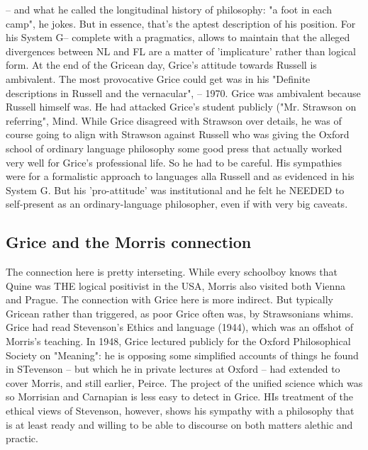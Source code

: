 \documentclass[10pt,titlepage]{book}
\begin{document}
{-- and  what he called the longitudinal history of philosophy: "a foot in 
each camp", he  jokes. But in essence, that's the aptest description of his 
position. For his  System G-- complete with a pragmatics, allows to maintain 
that the alleged  divergences between NL and FL are a matter of 
'implicature' rather than logical  form.  At the end of the Gricean  day, Grice's  
attitude towards Russell is ambivalent. The most  provocative Grice could  get 
was in his "Definite descriptions in Russell and the  
vernacular",  -- 1970. Grice was ambivalent because Russell himself was. He 
had attacked  Grice's student publicly ("Mr. Strawson on referring", Mind.  
While Grice  disagreed with Strawson over details, he was of course going 
to  align with  Strawson against Russell who was giving the Oxford school of 
ordinary   language philosophy some good press that actually worked very 
well for  Grice's  professional life. So he had to be careful. His sympathies 
were  for a  formalistic approach to languages alla Russell and as evidenced 
in  his System  G. But his 'pro-attitude' was institutional and he felt he  
NEEDED to  self-present as an ordinary-language philosopher, even if with  
very big  caveats. 

\subsection{Grice  and the Morris connection}

The connection here is pretty 
interseting. While  every schoolboy knows that Quine was THE logical positivist in the 
USA, Morris  also visited both Vienna and Prague. The connection with Grice 
here is more  indirect. But typically Gricean rather than triggered, as poor 
Grice often was,  by Strawsonians whims. Grice had read Stevenson's Ethics 
and language (1944),  which was an offshot of Morris's teaching. In 1948, 
Grice lectured publicly for  the Oxford Philosophical Society on "Meaning": he 
is opposing some simplified  accounts of things he found in STevenson -- 
but which he in private lectures at  Oxford --  had extended to cover Morris, 
and still earlier, Peirce. The  project of the unified science which was so 
Morrisian and Carnapian is less easy  to detect in Grice. HIs treatment of 
the ethical views of Stevenson, however,  shows his sympathy with a 
philosophy that is at least ready and willing to be  able to discourse on both 
matters alethic and practic.

}
\end{document}
